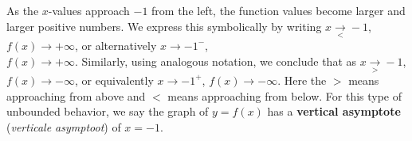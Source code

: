 


As the $x$-values approach $-1$ from the left, the function values become larger and larger positive numbers. We express this symbolically by writing $x \underset{<}{\rightarrow} -1$, $f(x) \rightarrow +\infty$, or alternatively  $x \to -1^-$, \\ $f(x) \rightarrow +\infty$. Similarly, using analogous notation, we conclude  that as $x \underset{>}{\rightarrow} -1$, $f(x) \rightarrow -\infty$, or equivalently $x \to -1^+$, $f(x) \rightarrow -\infty$.  Here the $>$ means approaching from above and $<$ means approaching from below. For this type of unbounded behavior, we say the graph of $y=f(x)$ has a \textbf{vertical asymptote} (\textit{verticale asymptoot}) of $x = -1$. 

